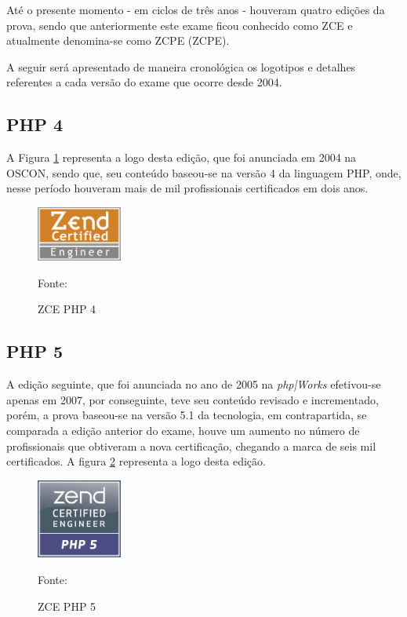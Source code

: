 Até o presente momento - em ciclos de três anos - houveram quatro edições da
prova, sendo que anteriormente este exame ficou conhecido como \ac{ZCE} e
atualmente denomina-se como \acl{ZCPE} (\acs{ZCPE}).

A seguir será apresentado de maneira cronológica os logotipos e detalhes
referentes a cada versão do exame que ocorre desde 2004.

\subsection{PHP 4}

A Figura \ref{fig:logoCertificationPHP4} representa a logo desta edição, que
foi anunciada em 2004 na \ac{OSCON}, sendo que, seu conteúdo baseou-se na versão
4 da linguagem \acs{PHP}, onde, nesse período houveram mais de mil profissionais 
certificados em dois anos.

\begin{figure}[h!tb]
	\caption{ZCE PHP 4}
	\label{fig:logoCertificationPHP4}

	\centering
	\includegraphics[width=0.25\textwidth]{images/logo/php4.png}

	\centering
	\footnotesize Fonte: 
\end{figure}

\FloatBarrier 	%

\subsection{PHP 5}

A edição seguinte, que foi anunciada no ano de 2005 na \textit{php|Works}
efetivou-se apenas em 2007, por conseguinte, teve seu conteúdo revisado e
incrementado, porém, a prova baseou-se na versão 5.1 da tecnologia, em
contrapartida, se comparada a edição anterior do exame, houve um aumento no
número de profissionais que obtiveram a nova certificação, chegando a marca de
seis mil certificados. A figura \ref{fig:logoCertificationPHP5} representa a
logo desta edição.

\begin{figure}[h!tb]
	\caption{ZCE PHP 5}
	\label{fig:logoCertificationPHP5}

	\centering
	\includegraphics[width=0.25\textwidth]{images/logo/php5.png}

	\centering
	\footnotesize Fonte: 
\end{figure}

